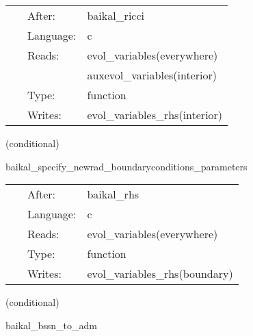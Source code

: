  \begin{tabular*}{160mm}{cll} 
~ & After:  & baikal\_ricci \\ 
~ & Language:  & c \\ 
~ & Reads:  & evol\_variables(everywhere) \\ 
~& ~ &auxevol\_variables(interior)\\ 
~ & Type:  & function \\ 
~ & Writes:  & evol\_variables\_rhs(interior) \\ 
\end{tabular*} 


\vspace{5mm}

   (conditional) 

\hspace{5mm} baikal\_specify\_newrad\_boundaryconditions\_parameters 

\hspace{5mm}{\it newrad boundary conditions, scheduled right after rhs eval. } 


\hspace{5mm}

 \begin{tabular*}{160mm}{cll} 
~ & After:  & baikal\_rhs \\ 
~ & Language:  & c \\ 
~ & Reads:  & evol\_variables(everywhere) \\ 
~ & Type:  & function \\ 
~ & Writes:  & evol\_variables\_rhs(boundary) \\ 
\end{tabular*} 


\vspace{5mm}

   (conditional) 

\hspace{5mm} baikal\_bssn\_to\_adm 

\hspace{5mm}{\it perform bssn-to-adm conversion. useful for diagnostics. } 


\hspace{5mm}


